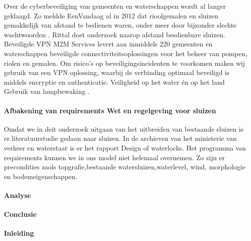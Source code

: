 Over de cyberbeveiliging van gemeenten en waterschappen wordt al langer geklaagd. Zo meldde EenVandaag al in 2012 dat rioolgemalen en sluizen gemakkelijk van afstand te bedienen waren, onder meer door bijzonder slechte wachtwoorden
\cite{cybersecWaterschappen}.
Rittal doet onderzoek naarop afstand besdienbare sluizen\cite{cybersecZuidHolland}.
Beveiligde VPN
M2M Services levert aan inmiddels 220 gemeenten en waterschappen beveiligde connectiviteitsoplossingen voor het beheer van pompen, riolen en gemalen. Om risico’s op beveiligingsincidenten te voorkomen maken wij gebruik van een VPN oplossing, waarbij de verbinding optimaal beveiligd is middels encryptie en authenticatie\cite{waterwerkNED}.
Veiligheid op het water én op het land Gebruik van lampbewaking \cite{veiligheidwaterland}. 



\paragraph{Afbakening van requirements Wet en regelgeving voor sluizen}
Omdat we in deit onderzoek uitgaan van het uitbreiden van bestaande sluizen is er literatuurstudie gedaan naar sluizen. In de archieven van het ministerie van verkeer en waterstaat is er het rapport Design of waterlocks\cite{CivilEngineeringDivision}.
Het programma van requirements kunnen we in ons model niet helemaal overnemen. 
Zo zijn er precondities zaols topgrafie,bestaande watersluizen,waterlevel, wind, morphologie en bodemeigenschappen.

 

\paragraph{Analyse}
\paragraph{Conclusie}

 


\paragraph{Inleiding}


\begin{center}
\end{center}













